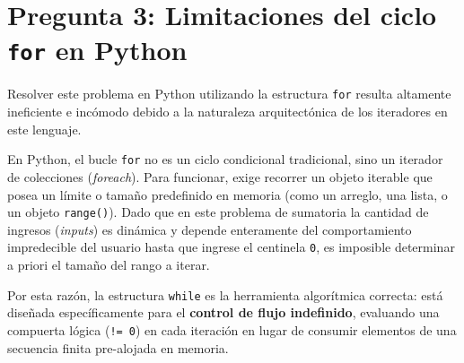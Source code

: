 \documentclass[11pt]{article}
\begin{document}
\section*{Pregunta 3: Limitaciones del ciclo \texttt{for} en Python}

Resolver este problema en Python utilizando la estructura \texttt{for} resulta altamente ineficiente e incómodo debido a la naturaleza arquitectónica de los iteradores en este lenguaje. 

En Python, el bucle \texttt{for} no es un ciclo condicional tradicional, sino un iterador de colecciones (\textit{foreach}). Para funcionar, exige recorrer un objeto iterable que posea un límite o tamaño predefinido en memoria (como un arreglo, una lista, o un objeto \texttt{range()}). Dado que en este problema de sumatoria la cantidad de ingresos (\textit{inputs}) es dinámica y depende enteramente del comportamiento impredecible del usuario hasta que ingrese el centinela \texttt{0}, es imposible determinar a priori el tamaño del rango a iterar. 

Por esta razón, la estructura \texttt{while} es la herramienta algorítmica correcta: está diseñada específicamente para el \textbf{control de flujo indefinido}, evaluando una compuerta lógica (\texttt{!= 0}) en cada iteración en lugar de consumir elementos de una secuencia finita pre-alojada en memoria.
\end{document}

